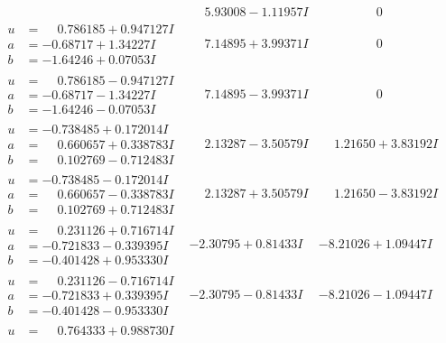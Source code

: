 \documentclass[1p]{elsarticle_modified}
\theoremstyle{definition}
\begin{document}
$$\begin{array}{c|c|c}
 & \phantom{-}5.93008 - 1.11957 I & \phantom{-0.000000 } 0 \\ \hline\begin{aligned}
u &= \phantom{-}0.786185 + 0.947127 I \\
a &= -0.68717 + 1.34227 I \\
b &= -1.64246 + 0.07053 I\end{aligned}
 & \phantom{-}7.14895 + 3.99371 I & \phantom{-0.000000 } 0 \\ \hline\begin{aligned}
u &= \phantom{-}0.786185 - 0.947127 I \\
a &= -0.68717 - 1.34227 I \\
b &= -1.64246 - 0.07053 I\end{aligned}
 & \phantom{-}7.14895 - 3.99371 I & \phantom{-0.000000 } 0 \\ \hline\begin{aligned}
u &= -0.738485 + 0.172014 I \\
a &= \phantom{-}0.660657 + 0.338783 I \\
b &= \phantom{-}0.102769 - 0.712483 I\end{aligned}
 & \phantom{-}2.13287 - 3.50579 I & \phantom{-}1.21650 + 3.83192 I \\ \hline\begin{aligned}
u &= -0.738485 - 0.172014 I \\
a &= \phantom{-}0.660657 - 0.338783 I \\
b &= \phantom{-}0.102769 + 0.712483 I\end{aligned}
 & \phantom{-}2.13287 + 3.50579 I & \phantom{-}1.21650 - 3.83192 I \\ \hline\begin{aligned}
u &= \phantom{-}0.231126 + 0.716714 I \\
a &= -0.721833 - 0.339395 I \\
b &= -0.401428 + 0.953330 I\end{aligned}
 & -2.30795 + 0.81433 I & -8.21026 + 1.09447 I \\ \hline\begin{aligned}
u &= \phantom{-}0.231126 - 0.716714 I \\
a &= -0.721833 + 0.339395 I \\
b &= -0.401428 - 0.953330 I\end{aligned}
 & -2.30795 - 0.81433 I & -8.21026 - 1.09447 I \\ \hline\begin{aligned}
u &= \phantom{-}0.764333 + 0.988730 I \\

\end{aligned}
\end{array}$$
\end{document}
